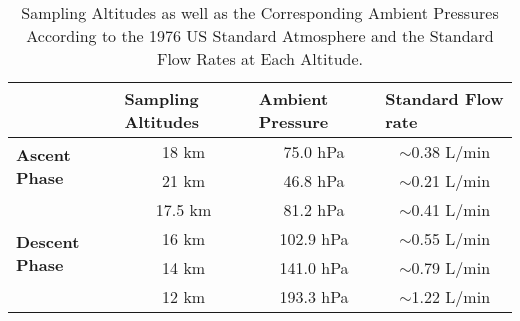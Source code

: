 \begin{table}[H]
\centering
\begin{tabular}{|l|c|c|c|}
\hline
 & \multicolumn{1}{l|}{\textbf{Sampling Altitudes}} & \multicolumn{1}{l|}{\textbf{Ambient Pressure}} & \multicolumn{1}{l|}{\textbf{Standard Flow rate}} \\ \hline
\multirow{2}{*}{\textbf{Ascent Phase}} & 18 km & 75.0 hPa & $\sim$0.38 L/min \\ \cline{2-4} 
 & 21 km & 46.8 hPa & $\sim$0.21 L/min \\ \hline
\multirow{4}{*}{\textbf{Descent Phase}} & 17.5 km & 81.2 hPa & $\sim$0.41 L/min \\ \cline{2-4} 
 & 16 km & 102.9 hPa & $\sim$0.55 L/min \\ \cline{2-4} 
 & 14 km & 141.0 hPa & $\sim$0.79 L/min \\ \cline{2-4} 
 & 12 km & 193.3 hPa & $\sim$1.22 L/min \\ \hline
\end{tabular}
\caption{Sampling Altitudes as well as the Corresponding Ambient Pressures According to the 1976 US Standard Atmosphere and the Standard Flow Rates at Each Altitude.}
\label{tab:flow-rates}
\end{table}